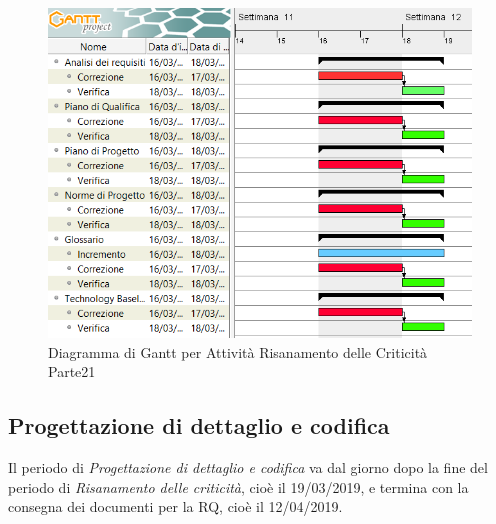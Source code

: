 \begin{figure}[h]
	\centering
  		\includegraphics[width=1.0\linewidth]{./images/RisanamentoCriticita2.png}
  		\caption{Diagramma di Gantt per Attività Risanamento delle Criticità Parte21}
  		\label{fig:Gantt Risananmento Criticità 2}
\end{figure}

\subsection{Progettazione di dettaglio e codifica}
Il periodo di \textit{Progettazione di dettaglio e codifica} va dal giorno dopo la fine del periodo di \textit{Risanamento delle criticità}, cioè il 19/03/2019, e termina con la consegna dei documenti per la RQ, cioè il 12/04/2019.\\

